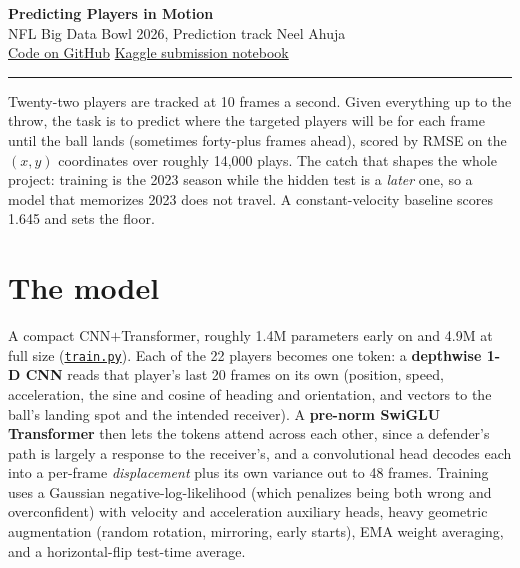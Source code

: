 \documentclass[11pt]{article}
\newcommand{\gh}[1]{\href{https://github.com/neelTheCoder/nfl-big-data-bowl-2026/blob/main/#1}{\texttt{#1}}}
\begin{document}
\begin{center}
{\LARGE\bfseries\color{accent} Predicting Players in Motion}\\[2pt]
{\normalsize NFL Big Data Bowl 2026, Prediction track \;\textbullet\; Neel Ahuja}\\[3pt]
{\small \href{https://github.com/neelTheCoder/nfl-big-data-bowl-2026}{Code on GitHub} \quad\textbullet\quad \href{https://www.kaggle.com/code/neel999/nfl-bdb26-submit}{Kaggle submission notebook}}
\end{center}
\vspace{-4pt}
\hrule
\vspace{2pt}

Twenty-two players are tracked at 10 frames a second. Given everything up to the throw, the task is to
predict where the targeted players will be for each frame until the ball lands (sometimes forty-plus
frames ahead), scored by RMSE on the $(x,y)$ coordinates over roughly 14{,}000 plays. The catch that
shapes the whole project: training is the 2023 season while the hidden test is a \emph{later} one, so a
model that memorizes 2023 does not travel. A constant-velocity baseline scores 1.645 and sets the
floor.

\section*{The model}
A compact CNN$+$Transformer, roughly 1.4M parameters early on and 4.9M at full size (\gh{train.py}).
Each of the 22 players becomes one token: a \textbf{depthwise 1-D CNN} reads that player's last 20
frames on its own (position, speed, acceleration, the sine and cosine of heading and orientation, and
vectors to the ball's landing spot and the intended receiver). A \textbf{pre-norm SwiGLU Transformer} then lets the tokens attend across each
other, since a defender's path is largely a response to the receiver's, and a convolutional head
decodes each into a per-frame \emph{displacement} plus its own variance out to 48 frames. Training uses
a Gaussian negative-log-likelihood (which penalizes being both wrong and overconfident) with velocity
and acceleration auxiliary heads, heavy geometric augmentation (random rotation, mirroring, early
starts), EMA weight averaging, and a horizontal-flip test-time average.
\end{document}
